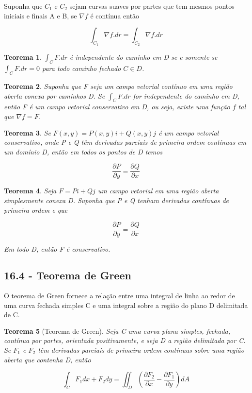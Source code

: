 \documentclass[12pt]{article}
\newtheorem{theorem}{Teorema}[section]
\begin{document}
Suponha que $C_1$ e $C_2$ sejam curvas suaves por partes que tem mesmos pontos iniciais e finais A e B, se $\nabla f$ é contínua então

$$\int_{C_1} \nabla f . dr = \int_{C_2} \nabla f . dr$$

\begin{theorem}
    $\int_C F.dr$ é independente do caminho em D se e somente se $\int_C F . dr = 0$ para todo caminho fechado $C \in D$.
\end{theorem}

\begin{theorem}
    Suponha que F seja um campo vetorial contínuo em uma região aberta conexa por caminhos D. Se $\int_C F . dr$ for independente do caminho em D, então F é um campo vetorial conservativo em D, ou seja, existe uma função $f$ tal que $\nabla f = F$.
\end{theorem}

\begin{theorem}
    Se $F(x, y) = P(x, y)i + Q(x, y)j$ é um campo vetorial conservativo, onde P e Q têm derivadas parciais de primeira ordem contínuas em um domínio D, então em todos os pontos de D temos

    $$\frac{\partial P}{\partial y} = \frac{\partial Q}{\partial x}$$
\end{theorem}

\begin{theorem}
    Seja $F = Pi + Qj$ um campo vetorial em uma região aberta simplesmente conexa D. Suponha que P e Q tenham derivadas contínuas de primeira ordem e que

    $$\frac{\partial P}{\partial y} = \frac{\partial Q}{\partial x}$$

    Em todo D, então F é conservativo.
\end{theorem}

\subsection*{16.4 - Teorema de Green}
O teorema de Green fornece a relação entre uma integral de linha ao redor de uma curva fechada simples C e uma integral sobre a região do plano D delimitada de C.

\begin{theorem}[Teorema de Green]
    Seja C uma curva plana simples, fechada, contínua por partes, orientada positivamente, e seja D a região delimitada por C. Se $F_1$ e $F_2$ têm derivadas parciais de primeira ordem contínuas sobre uma região aberta que contenha D, então
    
    $$\int_{C} F_1 d x + F_2 d y = \iint_D \left( \dfrac{\partial F_2}{\partial x} - \dfrac{\partial F_1}{\partial y} \right) d A$$
\end{theorem}
\end{document}
